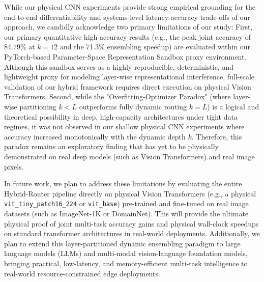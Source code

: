 While our physical CNN experiments provide strong empirical grounding for the end-to-end differentiability and systems-level latency-accuracy trade-offs of our approach, we candidly acknowledge two primary limitations of our study:
First, our primary quantitative high-accuracy results (e.g., the peak joint accuracy of 84.79\% at $k=12$ and the 71.3\% ensembling speedup) are evaluated within our PyTorch-based Parameter-Space Representation Sandbox proxy environment. Although this sandbox serves as a highly reproducible, deterministic, and lightweight proxy for modeling layer-wise representational interference, full-scale validation of our hybrid framework requires direct execution on physical Vision Transformers.
Second, while the "Overfitting-Optimizer Paradox" (where layer-wise partitioning $k < L$ outperforms fully dynamic routing $k = L$) is a logical and theoretical possibility in deep, high-capacity architectures under tight data regimes, it was not observed in our shallow physical CNN experiments where accuracy increased monotonically with the dynamic depth $k$. Therefore, this paradox remains an exploratory finding that has yet to be physically demonstrated on real deep models (such as Vision Transformers) and real image pixels.

In future work, we plan to address these limitations by evaluating the entire Hybrid-Router pipeline directly on physical Vision Transformers (e.g., a physical \texttt{vit\_tiny\_patch16\_224} or \texttt{vit\_base}) pre-trained and fine-tuned on real image datasets (such as ImageNet-1K or DomainNet). This will provide the ultimate physical proof of joint multi-task accuracy gains and physical wall-clock speedups on standard transformer architectures in real-world deployments. Additionally, we plan to extend this layer-partitioned dynamic ensembling paradigm to large language models (LLMs) and multi-modal vision-language foundation models, bringing practical, low-latency, and memory-efficient multi-task intelligence to real-world resource-constrained edge deployments.

